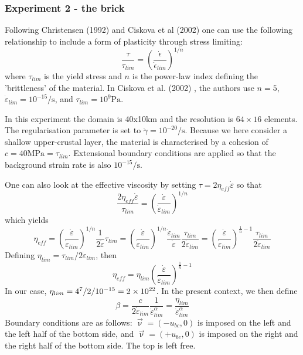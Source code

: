 \newpage
\subsubsection*{Experiment 2 - the brick }

Following Christensen (1992) \cite{chri92} and Ciskova et al (2002) \cite{civv02} 
one can use the following relationship to include a form of plasticity through stress limiting:
\[
\frac{\tau}{\tau_{lim}} = \left( \frac{ \dot{\epsilon}  }{ \dot{\epsilon}_{lim}  }  \right)^{1/n}
\]
where $\tau_{lim}$ is the yield stress and $n$ is the power-law index defining the 'brittleness'
of the material.
In Ciskova et al. (2002) \cite{civv02}, 
the authors use $n=5$, $\dot{\varepsilon}_{lim}=10^{-15}\si{\per\second}$, 
and $\tau_{lim}=10^{9}\si{\pascal}$. 

In this experiment the domain is 40x10\si{\kilo\metre} and the resolution is $64\times 16$ elements. 
The regularisation parameter is set to $\dot{\gamma}=10^{-20}\si{\per\second}$.
Because we here consider a shallow upper-crustal 
layer, the material is characterised by a cohesion of $c=40\si{\mega\pascal}=\tau_{lim}$.
Extensional boundary conditions are applied so that the background strain rate is 
also $10^{-15}\si{\per\second}$.

One can also look at the effective viscosity by 
setting $\tau = 2 \eta_{eff} \dot{\varepsilon}$ so that
\[
\frac{2 \eta_{eff}\dot{\varepsilon} }{\tau_{lim}} = 
\left( \frac{ \dot{\varepsilon}  }{ \dot{\varepsilon}_{lim}  }  \right)^{1/n}
\]
which yields
\[
\eta_{eff} = \left( \frac{ \dot{\varepsilon}  }{ \dot{\varepsilon}_{lim} } \right)^{1/n}   
\frac{1}{ 2\dot{\varepsilon}} \tau_{lim}
=
\left( \frac{ \dot{\varepsilon}  }{ \dot{\varepsilon}_{lim}  }  \right)^{1/n} 
\frac{\dot{\varepsilon}_{lim} }{\dot{\varepsilon}} \frac{\tau_{lim}   }{2 \dot{\varepsilon}_{lim}} 
=
\left( \frac{ \dot{\varepsilon}  }{ \dot{\varepsilon}_{lim}  }  \right)^{\frac{1}{n}-1}  
\frac{\tau_{lim}   }{2 \dot{\varepsilon}_{lim}} 
\]
Defining $\eta_{lim}=\tau_{lim} /  2 \dot{\varepsilon}_{lim}$, then
\[
\eta_{eff} = \eta_{lim} \left( \frac{ \dot{\varepsilon}  }{ \dot{\varepsilon}_{lim}  }  
\right)^{\frac{1}{n}-1}
\]
In our case, $\eta_{lim}= 4\time 10^7/2/10^{-15}=2\times10^{22}$. 
In the present context, we then define
\[
\beta 
= \frac{c}{2 \dot{\varepsilon}_{lim}} \frac{1}{\dot{\varepsilon}_{lim}^{\alpha}}
= \frac{ \eta_{lim} }{\dot{\varepsilon}_{lim}^{\alpha}}
\]
Boundary conditions are as follows: $\vec{\upnu}=(-u_{bc},0)$ is imposed on the left and the left half 
of the bottom side, and $\vec{\upnu}=(+u_{bc},0)$ is imposed on the right and the right half
of the bottom side. The top is left free.  

